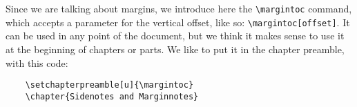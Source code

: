 Since we are talking about margins, we introduce here the 
\verb|\margintoc| command, which accepts a parameter for the vertical 
offset, like so: \verb|\margintoc[offset]|. It can be used in any point 
of the document, but we think it makes sense to use it at the beginning 
of chapters or parts. We like to put it in the chapter preamble, with 
this code:

\begin{verbatim}
	\setchapterpreamble[u]{\margintoc}
	\chapter{Sidenotes and Marginnotes}
\end{verbatim}
